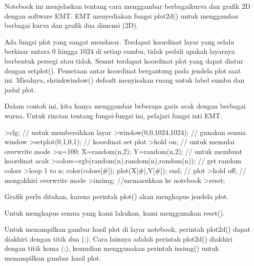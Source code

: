 \documentclass[a4paper,10pt]{article}
\begin{document}
\begin{eulernotebook}
\begin{eulercomment}
\begin{eulercomment}
\begin{eulercomment}
\begin{eulercomment}
\begin{eulercomment}
\begin{eulercomment}
\begin{eulercomment}
\begin{eulercomment}
\begin{eulercomment}
\begin{eulercomment}
\begin{eulercomment}
Notebook ini menjelaskan tentang cara menggambar berbagaikurva dan
grafik 2D dengan software EMT. EMT menyediakan fungsi plot2d() untuk
menggambar berbagai kurva dan grafik dua dimensi (2D).\\
\end{eulercomment}
\begin{eulercomment}
Ada fungsi plot yang sangat mendasar. Terdapat koordinat layar yang
selalu berkisar antara 0 hingga 1024 di setiap sumbu, tidak peduli
apakah layarnya berbentuk persegi atau tidak. Semut terdapat koordinat
plot yang dapat diatur dengan setplot(). Pemetaan antar koordinat
bergantung pada jendela plot saat ini. Misalnya, shrinkwindow()
default menyisakan ruang untuk label sumbu dan judul plot.

Dalam contoh ini, kita hanya menggambar beberapa garis acak dengan
berbagai warna. Untuk rincian tentang fungsi-fungsi ini, pelajari
fungsi inti EMT.
\end{eulercomment}
\begin{eulerprompt}
>clg; // untuk membersihkan layar
>window(0,0,1024,1024); // gunakan semua window
>setplot(0,1,0,1); // koordinat set plot
>hold on; // untuk memulai overwrite mode
>n=100; X=random(n,2); Y=random(n,2);  // untuk membuat koordinat acak
>colors=rgb(random(n),random(n),random(n)); // get random colors
>loop 1 to n; color(colors[#]); plot(X[#],Y[#]); end; // plot
>hold off; // mengakhiri overwrite mode
>insimg; //memasukkan ke notebook
>reset;
\end{eulerprompt}
\begin{eulercomment}
Grafik perlu ditahan, karena perintah plot() akan menghapus jendela
plot.

Untuk menghapus semua yang kami lakukan, kami menggunakan reset().

Untuk menampilkan gambar hasil plot di layar notebook, perintah
plot2d() dapat diakhiri dengan titik dua (:). Cara lainnya adalah
perintah plot2d() diakhiri dengan titik koma (;), kemudian menggunakan
perintah insimg() untuk menampilkan gambar hasil plot.


\end{eulercomment}
\end{eulercomment}
\end{eulercomment}
\end{eulercomment}
\end{eulercomment}
\end{eulercomment}
\end{eulercomment}
\end{eulercomment}
\end{eulercomment}
\end{eulercomment}
\end{eulercomment}
\end{eulernotebook}
\end{document}
